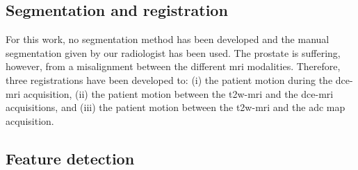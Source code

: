 \subsection{Segmentation and registration}\label{subsec:chp6:method:Seg-Reg}

For this work, no segmentation method has been developed and the manual segmentation given by our radiologist has been used.
The prostate is suffering, however, from a misalignment between the different \ac{mri} modalities.
Therefore, three registrations have been developed to: (i) the patient motion during the \ac{dce}-\ac{mri} acquisition, (ii) the patient motion between the \ac{t2w}-\ac{mri} and the \ac{dce}-\ac{mri} acquisitions, and (iii) the patient motion between the \ac{t2w}-\ac{mri} and the \ac{adc} map acquisition.



\subsection{Feature detection}\label{subsec:chp6:method:fea-det}




